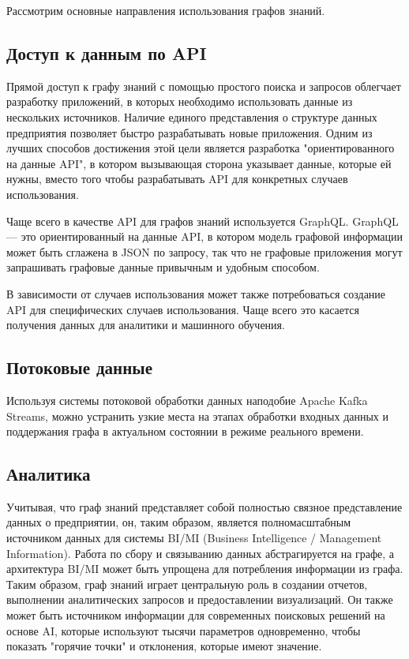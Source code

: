 Рассмотрим основные направления использования графов знаний.

\subsection{Доступ к данным по API}

Прямой доступ к графу знаний с помощью простого поиска и запросов облегчает разработку приложений, в которых необходимо использовать данные из нескольких источников. Наличие единого представления о структуре данных предприятия позволяет быстро разрабатывать новые приложения. Одним из лучших способов достижения этой цели является разработка "ориентированного на данные API", в котором вызывающая сторона указывает данные, которые ей нужны, вместо того чтобы разрабатывать API для конкретных случаев использования.

Чаще всего в качестве API для графов знаний используется GraphQL. GraphQL — это ориентированный на данные API, в котором модель графовой информации может быть сглажена в JSON по запросу, так что не графовые приложения могут запрашивать графовые данные привычным и удобным способом.

В зависимости от случаев использования может также потребоваться создание API для специфических случаев использования. Чаще всего это касается получения данных для аналитики и машинного обучения.

\subsection{Потоковые данные}

Используя системы потоковой обработки данных наподобие Apache Kafka Streams, можно устранить узкие места на этапах обработки входных данных и поддержания графа в актуальном состоянии в режиме реального времени.

\subsection{Аналитика}

Учитывая, что граф знаний представляет собой полностью связное представление данных о предприятии, он, таким образом, является полномасштабным источником данных для системы BI/MI (Business Intelligence / Management Information). Работа по сбору и связыванию данных абстрагируется на графе, а архитектура BI/MI может быть упрощена для потребления информации из графа. Таким образом, граф знаний играет центральную роль в создании отчетов, выполнении аналитических запросов и предоставлении визуализаций. Он также может быть источником информации для современных поисковых решений на основе AI, которые используют тысячи параметров одновременно, чтобы показать "горячие точки" и отклонения, которые имеют значение.

